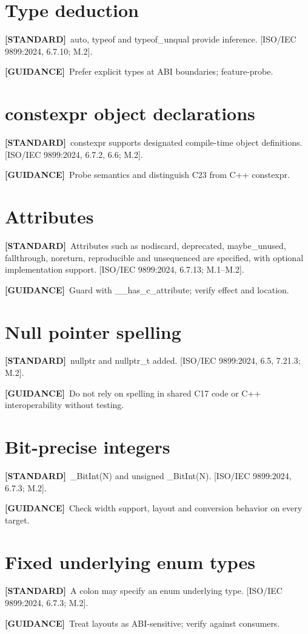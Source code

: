 \documentclass[10pt,letterpaper,oneside]{report}
\newcommand{\refcl}[1]{\textsf{\footnotesize[ISO/IEC 9899:2024, #1]}}
\newcommand{\standard}{\textbf{[STANDARD]}}
\newcommand{\guidance}{\textbf{[GUIDANCE]}}
\begin{document}
\section{Type deduction}
\standard\ auto, typeof and typeof\_unqual provide inference. \refcl{6.7.10; M.2}.\par\guidance\ Prefer explicit types at ABI boundaries; feature-probe.

\section{constexpr object declarations}
\standard\ constexpr supports designated compile-time object definitions. \refcl{6.7.2, 6.6; M.2}.\par\guidance\ Probe semantics and distinguish C23 from C++ constexpr.

\section{Attributes}
\standard\ Attributes such as nodiscard, deprecated, maybe\_unused, fallthrough, noreturn, reproducible and unsequenced are specified, with optional implementation support. \refcl{6.7.13; M.1--M.2}.\par\guidance\ Guard with \_\_has\_c\_attribute; verify effect and location.

\section{Null pointer spelling}
\standard\ nullptr and nullptr\_t added. \refcl{6.5, 7.21.3; M.2}.\par\guidance\ Do not rely on spelling in shared C17 code or C++ interoperability without testing.

\section{Bit-precise integers}
\standard\ \_BitInt(N) and unsigned \_BitInt(N). \refcl{6.7.3; M.2}.\par\guidance\ Check width support, layout and conversion behavior on every target.

\section{Fixed underlying enum types}
\standard\ A colon may specify an enum underlying type. \refcl{6.7.3; M.2}.\par\guidance\ Treat layouts as ABI-sensitive; verify against consumers.
\end{document}

